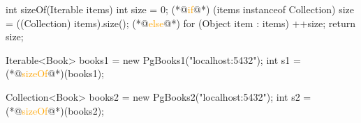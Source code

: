 \documentclass{article}
\begin{document}
\begin{lnSnippet}
int sizeOf(Iterable items) {
  int size = 0;
  (*@\textcolor{orange}{if}@*) (items instanceof Collection) {
    size = ((Collection) items).size();
  } (*@\textcolor{orange}{else}@*) {
    for (Object item : items) {
      ++size;
    }
  }
  return size;
}
\end{lnSnippet}
\begin{lnSnippet}
Iterable<Book> books1 =
  new PgBooks1("localhost:5432");
int s1 = (*@\textcolor{orange}{sizeOf}@*)(books1);

Collection<Book> books2 =
  new PgBooks2("localhost:5432");
int s2 = (*@\textcolor{orange}{sizeOf}@*)(books2);
\end{lnSnippet}
\end{document}
